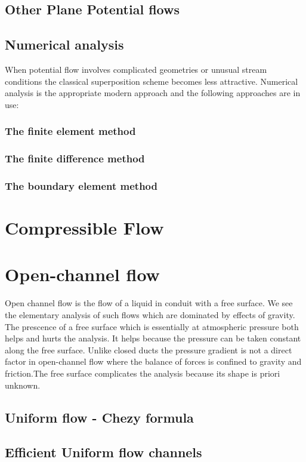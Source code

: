 \documentclass{report}
\begin{document}
\section{Other Plane Potential flows}
\section{Numerical analysis}
When potential flow involves complicated geometries or unusual stream conditions the classical 
superposition scheme becomes less attractive. Numerical analysis is the appropriate 
modern approach and the following approaches are in use:
\subsection{The finite element method}
\subsection{The finite difference method}
\subsection{The boundary element method}

\chapter{Compressible Flow}
\chapter{Open-channel flow}
Open channel flow is the flow of a liquid in conduit with a free surface. We see the elementary analysis of such flows which are dominated
by effects of gravity. The prescence of a free surface which is essentially at atmospheric pressure both helps and hurts the analysis. It helps
because the pressure can be taken constant along the free surface. Unlike closed ducts the pressure gradient is not a direct factor in
open-channel flow where the balance of forces is confined to gravity and friction.The free surface complicates the analysis because its shape
is priori unknown.


\section{Uniform flow - Chezy formula}
\section{Efficient Uniform flow channels}
\end{document}
